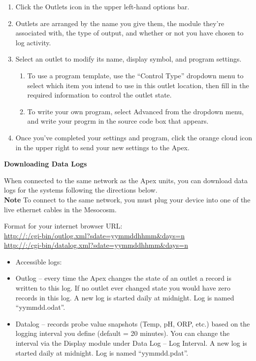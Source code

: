 \documentclass[]{book}
\providecommand{\tightlist}{%
  \setlength{\itemsep}{0pt}\setlength{\parskip}{0pt}}
\begin{document}
\begin{enumerate}
\def\labelenumi{\arabic{enumi}.}
\tightlist
\item
  Click the Outlets icon in the upper left-hand options bar.
\item
  Outlets are arranged by the name you give them, the module they're
  associated with, the type of output, and whether or not you have
  chosen to log activity.
\item
  Select an outlet to modify its name, display symbol, and program
  settings.

  \begin{enumerate}
  \def\labelenumii{\arabic{enumii}.}
  \tightlist
  \item
    To use a program template, use the ``Control Type'' dropdown menu to
    select which item you intend to use in this outlet location, then
    fill in the required information to control the outlet state.
  \item
    To write your own program, select Advanced from the dropdown menu,
    and write your progrm in the source code box that appears.
  \end{enumerate}
\item
  Once you've completed your settings and program, click the orange
  cloud icon in the upper right to send your new settings to the Apex.
\end{enumerate}

 \textbf{Downloading Data Logs}

When connected to the same network as the Apex units, you can download
data logs for the systems following the directions below.\\
\textbf{Note} To connect to the same network, you must plug your device
into one of the live ethernet cables in the Mesocosm.

Format for your internet browser URL:\\
\url{http://:/cgi-bin/outlog.xml?sdate=yymmddhhmm\&days=n}\\
\url{http://:/cgi-bin/datalog.xml?sdate=yymmddhhmm\&days=n}

\begin{itemize}
\tightlist
\item
  Accessible logs:
\item
  Outlog -- every time the Apex changes the state of an outlet a record
  is written to this log. If no outlet ever changed state you would have
  zero records in this log. A new log is started daily at midnight. Log
  is named ``yymmdd.odat''.
\item
  Datalog -- records probe value snapshots (Temp, pH, ORP, etc.) based
  on the logging interval you define (default = 20 minutes). You can
  change the interval via the Display module under Data Log -- Log
  Interval. A new log is started daily at midnight. Log is named
  ``yymmdd.pdat''.
\end{itemize}
\end{document}
